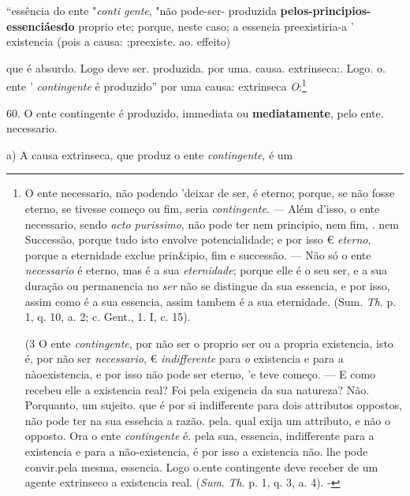 “essência do ente "\emph{conti gente}, "não pode-ser- produzida \textbf{pelos-principios-essenciáesdo} proprio ete; porque, neste caso; a essencia preexistiria-a ' existencia (pois a causa: ;preexiste. ao. effeito)

que é absurdo. Logo deve ser. produzida. por uma. causa. extrinseca:. Logo. o. ente ' \emph{contingente} é produzido” por uma causa: extrinseca \emph{O}:\footnote{O ente necessario, não podendo 'deixar de ser, é eterno; porque, se não fosse eterno, se tivesse começo ou fim, seria \emph{contingente}. --- Além d'isso, o ente necessario, sendo \emph{acto purissimo}, não pode ter nem principio, nem fim, . nem Successão, porque tudo isto envolve potencialidade; e por isso € \emph{eterno}, porque a eternidade exclue prin\&ipio, fim e successão. --- Não só o ente \emph{necessario} é eterno, mas é a sua \emph{eternidade}; porque elle é o seu ser, e a sua duração ou permanencia no \emph{ser} não se distingue da sua essencia, e por isso, assim como é a sua essencia, assim tambem é a sua eternidade. (Sum. \emph{Th}. p. 1, q. 10, a. 2; c. Gent., 1. I, c. 15).\par (3 O ente \emph{contingente}, por não ser o proprio ser ou a propria existencia, isto é, por não ser \emph{necessario}, € \emph{indifferente} para \emph{o} existencia e para a nàoexistencia, e por isso não pode ser eterno, 'e teve começo. --- E como recebeu elle a existencia real? Foi pela exigencia da sua natureza? Não. Porquanto, um sujeito. que é por si indifferente para dois attributos oppostos, não pode ter na sua essehcia a razão. pela. qual exija um attributo, e não o opposto. Ora o ente \emph{contingente} é. pela sua, essencia, indifferente para a existencia e para a não-existencia, é por isso a existencia não. lhe pode convir.pela mesma, essencia. Logo o.ente contingente deve receber de um agente extrinseco a existencia real. (\emph{Sum}. \emph{Th}. p. 1, q. 3, a. 4). -}

 \textbar{} 60. O ente contingente é produzido, immediata ou \textbf{mediatamente}, pelo ente. necessario.

a) A causa extrinseca, que produz o ente \emph{contingente}, é um

